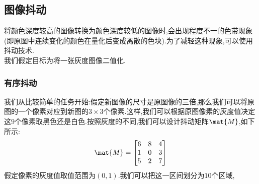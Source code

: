 \documentclass{ctexart}
\begin{document}
\subsection{图像抖动}
将颜色深度较高的图像转换为颜色深度较低的图像时,会出现程度不一的色带现象(即原图中连续变化的颜色在量化后变成离散的色块).为了减轻这种现象,可以使用抖动技术.\\
\indent 我们假定目标为将一张灰度图像二值化.
\subsubsection{有序抖动}
我们从比较简单的任务开始:假定新图像的尺寸是原图像的三倍,那么我们可以将原图的一个像素对应到新图的$3\times3$个像素.这样,我们可以根据原图像素的灰度值决定这$9$个像素取黑色还是白色.按照灰度的不同,我们可以设计抖动矩阵$\mat{M}$,如下所示:
\[\mat{M} = \begin{bmatrix}
    6 & 8 & 4 \\
    1 & 0 & 3 \\
    5 & 2 & 7
\end{bmatrix}\]
假定像素的灰度值取值范围为$(0,1)$.我们可以把这一区间划分为$10$个区域,
\end{document}
